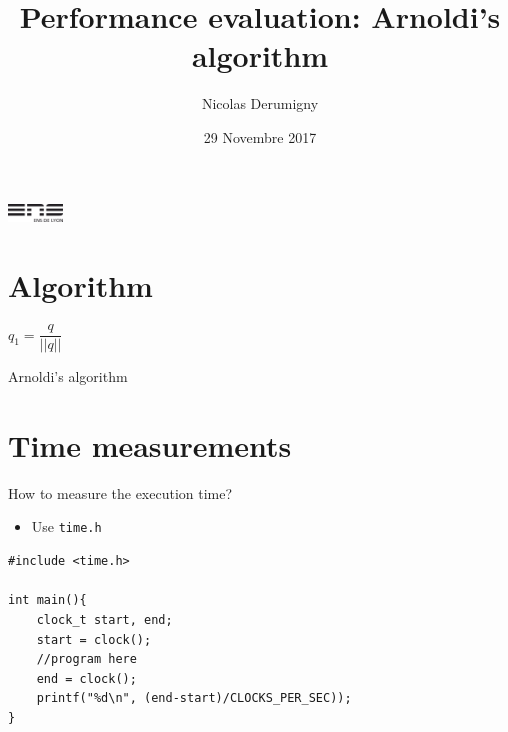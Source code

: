 \documentclass{beamer}
\title[MPNA]{Performance evaluation: Arnoldi's algorithm}
\author[N.D.]{Nicolas Derumigny}
\institute[]{ENS Lyon}
\date{29 Novembre 2017}
\begin{document}
\begin{frame}
	\titlepage
	\begin{center}
	\includegraphics[height=0.5cm]{logoens.pdf}

	\end{center}
\end{frame}

\section{Algorithm}
\begin{frame}
\begin{algorithm}[H]
$q_1 = \dfrac{q}{||q||}$ \\
\caption{Arnoldi's algorithm}
\end{algorithm}
\end{frame}

\section{Time measurements}
\begin{frame}[fragile]{How to measure the execution time?}
\begin{itemize}
\item Use \texttt{time.h}
\end{itemize}
\bigskip
\begin{lstlisting}[frame=single]
#include <time.h>

int main(){
	clock_t start, end;
	start = clock();
	//program here
	end = clock();
	printf("%d\n", (end-start)/CLOCKS_PER_SEC));
}
\end{lstlisting}
\end{frame}
\end{document}
